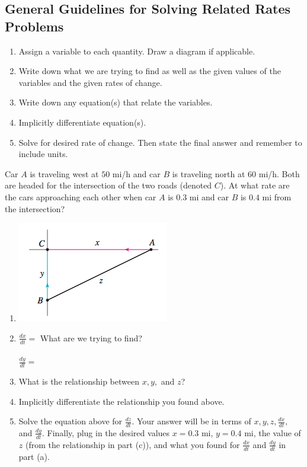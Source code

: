 \documentclass[12pt, a4paper]{article}
\begin{document}
\subsection*{General Guidelines for Solving Related Rates Problems}
\begin{enumerate}
\item Assign a variable to each quantity. Draw a diagram if applicable.
\item Write down what we are trying to find as well as the given values of the variables and the given rates of change.
\item Write down any equation(s) that relate the variables.
\item Implicitly differentiate equation(s).
\item Solve for desired rate of change. Then state the final answer and remember to include units.
\end{enumerate}
\begin{ex}
  Car \(A\) is traveling west at \(50\) mi/h and car \(B\) is
  traveling north at \(60\) mi/h. Both are headed for the intersection
  of the two roads (denoted \(C\)). At what rate are the cars
  approaching each other
  when car \(A\) is \(0.3\) mi and car \(B\) is \(0.4\) mi from the
  intersection?
\end{ex}
\vspace{-2in}
\begin{enumerate}
\item \includegraphics[scale=0.5]{images/cars-at-intersection}

\item   \(\frac{dx}{dt} = \) \hspace{2in} What are we trying to find?
  \\ \\
   \(\frac{dy}{dt} = \)
\item What is the relationship
  between \(x,y,\) and \(z\)?
  \vspace{1in}
\item Implicitly differentiate the relationship you found above.
  \vspace{1in}
\item Solve the equation above for \(\frac{dz}{dt}\). Your answer will
  be in terms of \(x,y,z,\frac{dx}{dt},\) and
  \(\frac{dy}{dt}\). Finally, plug in the desired values \(x=0.3\) mi,
  \(y = 0.4\) mi, the value of \(z\) (from the
  relationship in part (c)), and what you found for \(\frac{dx}{dt}\) and
  \(\frac{dy}{dt}\) in part (a).
\end{enumerate} \vspace{1in}
\end{document}
